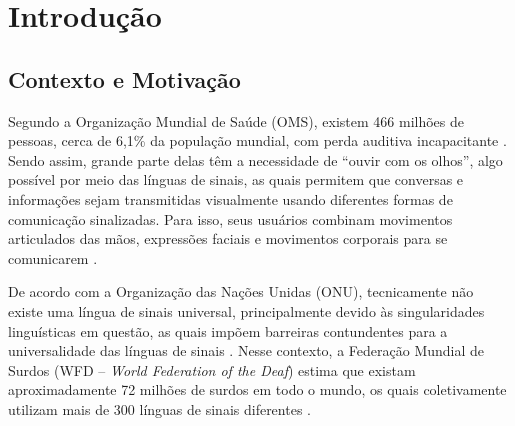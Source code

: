 \chapter{Introdução}
\label{chapter:introducao}

\section{Contexto e Motivação}



Segundo a Organização Mundial de Saúde (OMS), existem 466 milhões de pessoas, cerca de 6,1\% da população mundial, com perda auditiva incapacitante \cite{OMS2018}. Sendo assim, grande parte delas têm a necessidade de ``ouvir com os olhos'', algo possível por meio das línguas de sinais, as quais permitem que conversas e informações sejam transmitidas visualmente usando diferentes formas de comunicação sinalizadas. Para isso, seus usuários combinam movimentos articulados das mãos, expressões faciais e movimentos corporais para se comunicarem \cite{Duke2009, Quadros2019, Honora2017}.

De acordo com a Organização das Nações Unidas (ONU), tecnicamente não existe uma língua de sinais universal, principalmente devido às singularidades linguísticas em questão, as quais impõem barreiras contundentes para a universalidade das línguas de sinais \cite{ONU2019, Quadros2019}. Nesse contexto, a Federação Mundial de Surdos (WFD -- \textit{World Federation of the Deaf}) estima que existam aproximadamente 72 milhões de surdos em todo o mundo, os quais coletivamente utilizam mais de 300 línguas de sinais diferentes \cite{ONU2019}.

